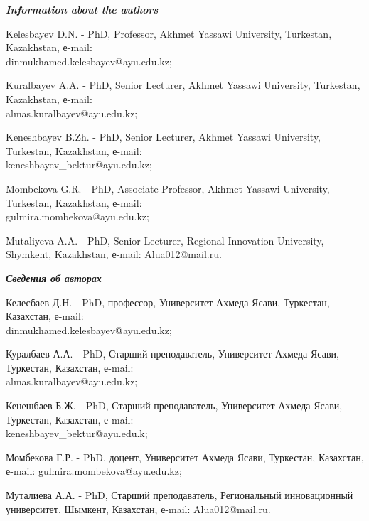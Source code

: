 \begin{authorinfo}
\hspace{1em}\emph{{\bfseries Information about the authors}}

Kelesbayev D.N. - PhD, Professor, Akhmet Yassawi University, Turkestan,
Kazakhstan, е-mail: \\dinmukhamed.kelesbayev@ayu.edu.kz;

Kuralbayev A.A. - PhD, Senior Lecturer, Akhmet Yassawi University,
Turkestan, Kazakhstan, е-mail: \\almas.kuralbayev@ayu.edu.kz;

Keneshbayev B.Zh. - PhD, Senior Lecturer, Akhmet Yassawi University,
Turkestan, Kazakhstan, е-mail: \\keneshbayev\_bektur@ayu.edu.kz;

Mombekova G.R. - PhD, Associate Professor, Akhmet Yassawi University,
Turkestan, Kazakhstan, е-mail: \\gulmira.mombekova@ayu.edu.kz;

Mutaliyeva A.A. - PhD, Senior Lecturer, Regional Innovation University,
Shymkent, Kazakhstan, е-mail: Alua012@mail.ru.

\hspace{1em}\emph{{\bfseries Сведения об авторах}}

Келесбаев Д.Н. - PhD, профессор, Университет Ахмеда Ясави, Туркестан,
Казахстан, е-mail: \\dinmukhamed.kelesbayev@ayu.edu.kz;

Куралбаев А.А. - PhD, Старший преподаватель, Университет Ахмеда Ясави,
Туркестан, Казахстан, е-mail: \\almas.kuralbayev@ayu.edu.kz;

Кенешбаев Б.Ж. - PhD, Старший преподаватель, Университет Ахмеда Ясави,
Туркестан, Казахстан, е-mail: \\keneshbayev\_bektur@ayu.edu.k;

Момбекова Г.Р. - PhD, доцент, Университет Ахмеда Ясави, Туркестан,
Казахстан, е-mail: gulmira.mombekova@ayu.edu.kz;

Муталиева А.А. - PhD, Старший преподаватель, Региональный инновационный
университет, Шымкент, Казахстан, е-mail: Alua012@mail.ru.
\end{authorinfo}
